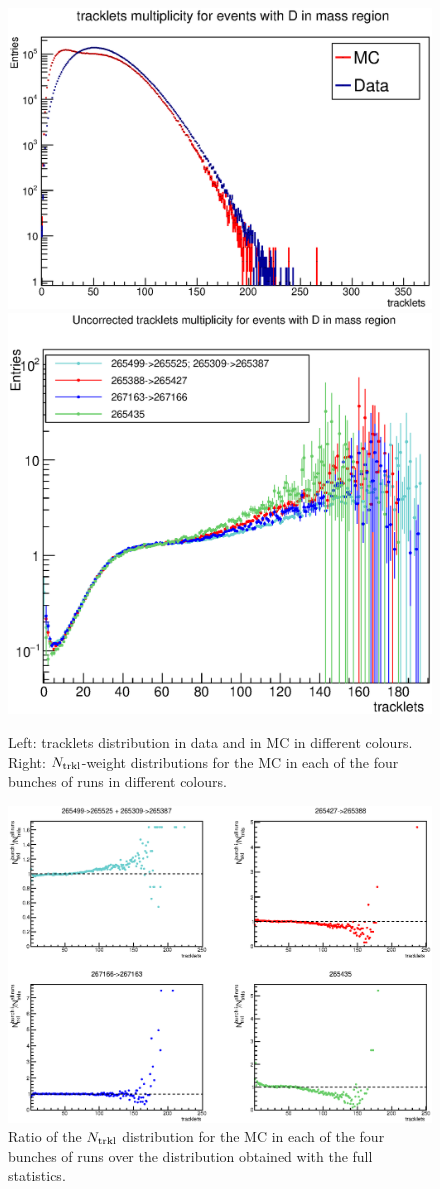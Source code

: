 \begin{figure}[h]
\centering
 \includegraphics[width=.49\textwidth]{FigCap6/NtrkDistrWithDDataMC.eps}
 \includegraphics[width=.43\textwidth]{FigCap6/NtrklWeights4Bunches.eps}
 \caption{Left: tracklets distribution in data and in MC in different colours. Right: $N_{\rm trkl}$-weight distributions for the MC in each of the four bunches of runs in different colours.}
 \label{fig:NtrklDataMC}
\end{figure}

\begin{figure}[h]
\centering
 \includegraphics[width=.85\textwidth]{FigCap6/NtrkDistrMC_17d2a_EvWithD_zVxtUnCorr_896_897.eps}
 \caption{Ratio of the $N_{\rm trkl}$ distribution for the MC in each of the four bunches of runs over the distribution obtained with the full statistics.}
 \label{fig:NtrklDataMC}
\end{figure}

